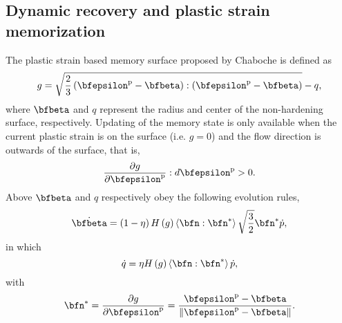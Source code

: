 \subsection{Dynamic recovery and plastic strain memorization}
\noindent
The plastic strain based memory surface proposed by Chaboche \cite{Chaboche1986149} is defined as
\begin{equation}
\label{Equ:g1}
g = \sqrt {\frac{2}{3}\left( {{\bfepsilon^{\rm{p}}} - \bfbeta} \right):\left( {{\bfepsilon^{\rm{p}}} - \bfbeta} \right)}  - q,
\end{equation}
where $\bfbeta$ and $q$ represent the radius and center of the non-hardening surface, respectively.
Updating of the memory state is only available when the current plastic strain is on the surface (i.e. $g=0$) and the flow direction is outwards of the surface, that is,
\begin{equation}
\frac{{\partial g}}{{\partial {\bfepsilon^{\rm{p}}}}}:d{\bfepsilon^{\rm{p}}} > 0.
\end{equation}
Above $\bfbeta$ and $q$ respectively obey the following evolution rules,
\begin{equation}
\label{Equ:dotbeta1}
\dot\bfbeta  = \left( {1 - \eta } \right)H\left( g \right)\left\langle {\bfn:{\bfn^*}} \right\rangle \sqrt {\frac{3}{2}} {\bfn^*}\dot p,
\end{equation}
in which
\begin{equation}
\label{Equ:dotq1}
\dot q = \eta H\left( g \right)\left\langle {\bfn:{\bfn^*}} \right\rangle \dot p,
\end{equation}
with
\begin{equation}
\label{Equ:nstar}
{\bfn^*} = \frac{{\partial g}}{{\partial {\bfepsilon^{\rm{p}}}}} = \frac{{{\bfepsilon^{\rm{p}}} - \bfbeta}}{{\left\| {{\bfepsilon^{\rm{p}}} - \bfbeta} \right\|}}.
\end{equation}

